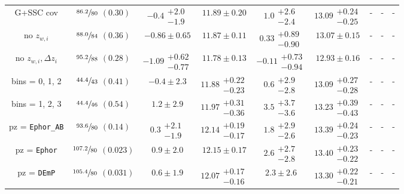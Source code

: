 \documentclass[a4paper,11pt]{article}
\begin{document}
\begin{table}
\begin{center}
\begin{tabular}{ccccccccc}
            G+SSC cov & $\sfrac{86.2}{80}$ $(0.30)$ & $-0.4\substack{+2.0 \\ -1.9}$ & $11.89 \pm 0.20$ & $1.0\substack{+2.6 \\ -2.4}$ & $13.09\substack{+0.24 \\ -0.25}$ & - & - & - \\
            no $z_{w, i}$ & $\sfrac{88.0}{84}$ $(0.36)$ & $-0.86 \pm 0.65$ & $11.87 \pm 0.11$ & $0.33\substack{+0.89 \\ -0.90}$ & $13.07 \pm 0.15$ & - & - & - \\
            no $z_{w, i}, \Delta z_{i}$ & $\sfrac{95.2}{88}$ $(0.28)$ & $-1.09\substack{+0.62 \\ -0.77}$ & $11.78 \pm 0.13$ & $-0.11\substack{+0.73 \\ -0.94}$ & $12.93 \pm 0.16$ & - & - & - \\
            bins = 0, 1, 2 & $\sfrac{44.4}{43}$ $(0.41)$ & $-0.4\pm 2.3$ & $11.88\substack{+0.22 \\ -0.23}$ & $0.6\substack{+2.9 \\ -2.8}$ & $13.09\substack{+0.27 \\ -0.28}$ & - & - & - \\
            bins = 1, 2, 3 & $\sfrac{44.4}{46}$ $(0.54)$ & $1.2\pm 2.9$ & $11.97\substack{+0.31 \\ -0.36}$ & $3.5\substack{+3.7 \\ -3.6}$ & $13.23\substack{+0.39 \\ -0.43}$ & - & - & - \\
            pz = \texttt{Ephor\_AB} & $\sfrac{93.6}{80}$ $(0.14)$ & $0.3\substack{+2.1 \\ -1.9}$ & $12.14\substack{+0.19 \\ -0.17}$ & $1.8\substack{+2.9 \\ -2.6}$ & $13.39\substack{+0.24 \\ -0.23}$ & - & - & - \\
            pz = \texttt{Ephor} & $\sfrac{107.2}{80}$ $(0.023)$ & $0.9\pm 2.0$ & $12.15 \pm 0.17$ & $2.6\substack{+2.7 \\ -2.8}$ & $13.40\substack{+0.23 \\ -0.22}$ & - & - & - \\
            pz = \texttt{DEmP} & $\sfrac{105.4}{80}$ $(0.031)$ & $0.6\pm 1.9$ & $12.07\substack{+0.17 \\ -0.16}$ & $2.3\pm 2.6$ & $13.30\substack{+0.22 \\ -0.21}$ & - & - & - \\

\end{tabular}
\end{center}
\end{table}
\end{document}
